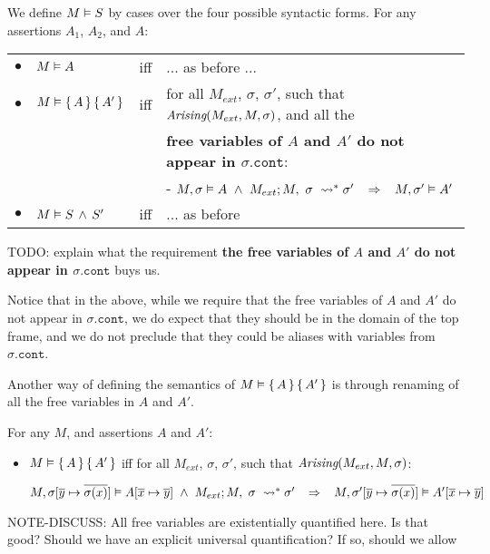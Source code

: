 \begin{definition}
We define $M \vDash {S}$ by cases over the four possible syntactic forms.
For any assertions   $A_1$, $A_2$, and $A$: \\

\label{def:necessity-semantics}

\begin{tabular}{llcl}
$\bullet$ & $M \vDash {A}$& iff & ... as before ... \\
$\bullet$ &  $M \vDash {\{}\, A \,{\}} \,{\{}\, A' \,{\}}$ &  iff   &  for all $M_{ext}$, $\sigma$, $\sigma'$, such that $\textit{Arising}(M_{ext}, M, \sigma)$, and all the \\
& & & {\textbf {free variables of $A$ and $A'$ do not appear in $\sigma.{\texttt{cont}}$}}: \\  
 & & & -   $\satisfiesA{M}{\sigma}{A}\  \wedge \ \reductions{M_{ext}}{M}{\sigma}{\sigma'} \;\;\;\Rightarrow\;\;\; \satisfiesA{M}{\sigma'}{A'}$   
\\
$\bullet$ &  $M \vDash S\, \wedge\, S'$ &   iff   & ... as before 
\end{tabular} 

TODO: explain what the requirement {\textbf {the free variables of $A$ and $A'$ do not appear in $\sigma.{\texttt{cont}}$}} buys us. 

Notice that in the above, while we require that the free variables of $A$ and $A'$ do not appear in $\sigma.{\texttt{cont}}$, we do expect that they should be in the domain of the top frame, and we do not preclude that they could be aliases with variables from 
$\sigma.{\texttt{cont}}$.

Another way of defining the semantics of $M \vDash {\{}\, A \,{\}} \,{\{}\, A' \,{\}}$  is through renaming of all the free variables in $A$ and $A'$.

\begin{lemma}
For any $M$, and assertions $A$ and $A'$:

\begin{itemize}
\item $M \vDash {\{}\, A \,{\}} \,{\{}\, A' \,{\}}$ iff for all $M_{ext}$, $\sigma$, $\sigma'$, such that $\textit{Arising}(M_{ext}, M, \sigma)$: 
\\
\strut \hspace{0.1cm} $M , \sigma[\overline y \mapsto \overline {\sigma (x)}] \vDash A [\overline x \mapsto \overline {y}]
\  \wedge \ M_{ext} ; M,\ \sigma\ \leadsto^* \sigma' \;\;\;\Rightarrow\;\;\; M , \sigma'[\overline y \mapsto \overline {\sigma (x)}] \vDash A'[\overline x \mapsto \overline {y}]$
\end{itemize} 
\end{lemma}

NOTE-DISCUSS: All free variables are existentially quantified here. Is that good? Should we have an explicit universal quantification? If so, should we allow 

\end{definition} 

